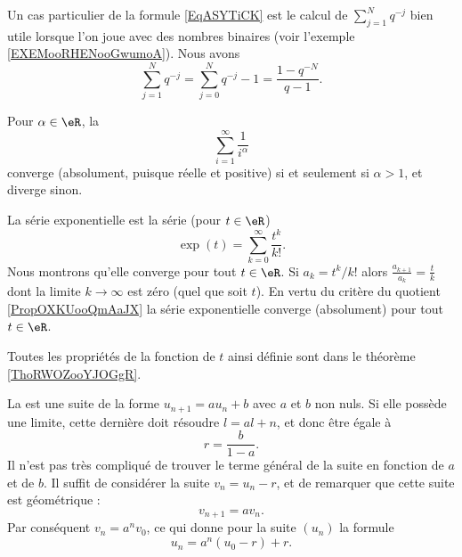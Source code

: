 Un cas particulier de la formule \eqref{EqASYTiCK} est le calcul de \( \sum_{j=1}^{N}q^{-j}\) bien utile lorsque l'on joue avec des nombres binaires (voir l'exemple \ref{EXEMooRHENooGwumoA}). Nous avons
\begin{equation}        \label{EQooFMBAooEJkHWT}
    \sum_{j=1}^Nq^{-j}=\sum_{j=0}^Nq^{-j}-1=\frac{ 1-q^{-N} }{ q-1 }.
\end{equation}

\begin{example}       \label{EXooCTYNooCjYQvJ}
    Pour $\alpha \in \eR$, la 
    \begin{equation}        \label{EqSerRiem}
        \sum_{i=1}^\infty \frac1{i^\alpha}
    \end{equation}
    converge (absolument, puisque réelle et positive) si et seulement si $\alpha > 1$, et diverge sinon.
\end{example}

\begin{example} \label{ExIJMHooOEUKfj}
    La série exponentielle est la série (pour \( t\in \eR\))
    \begin{equation}
        \exp(t)=\sum_{k=0}^{\infty}\frac{ t^k }{ k! }.
    \end{equation}
    Nous montrons qu'elle converge pour tout \( t\in \eR\). Si \( a_k=t^k/k!\) alors \( \frac{ a_{k+1} }{ a_k }=\frac{ t }{ k }\) dont la limite \( k\to \infty\) est zéro (quel que soit \( t\)). En vertu du critère du quotient \ref{PropOXKUooQmAaJX} la série exponentielle converge (absolument) pour tout \( t\in \eR\).

    Toutes les propriétés de la fonction de \( t\) ainsi définie sont dans le théorème \ref{ThoRWOZooYJOGgR}.
\end{example}

\begin{example}
    La  est une suite de la forme \( u_{n+1}=au_n+b\) avec \( a\) et \( b\) non nuls. Si elle possède une limite, cette dernière doit résoudre \( l=al+n\), et donc être égale à 
    \begin{equation}
        r=\frac{ b }{ 1-a }.
    \end{equation}
    Il n'est pas très compliqué de trouver le terme général de la suite en fonction de \( a\) et de \( b\). Il suffit de considérer la suite \( v_n=u_n-r\), et de remarquer que cette suite est géométrique :
    \begin{equation}
        v_{n+1}=av_n.
    \end{equation}
    Par conséquent \( v_n=a^nv_0\), ce qui donne pour la suite \( (u_n)\) la formule
    \begin{equation}
        u_n=a^n(u_0-r)+r.
    \end{equation}
\end{example}

